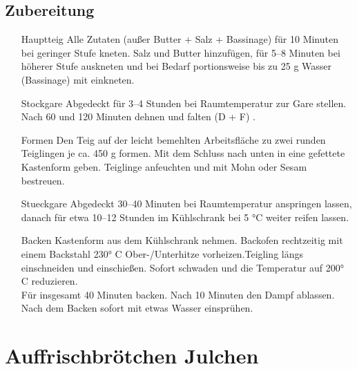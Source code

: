 \subsection*{Zubereitung}
\begin{enumerate}
    \item  [\Gls{Hauptteig}]  Alle Zutaten (außer Butter + Salz + Bassinage) für 10 Minuten bei geringer Stufe kneten. Salz und Butter hinzufügen, für 5–8 Minuten bei höherer Stufe auskneten und bei Bedarf portionsweise bis zu 25 g     Wasser (Bassinage) mit einkneten.
    \item [\Gls{Stockgare}] Abgedeckt für 3–4 Stunden bei Raumtemperatur zur Gare stellen. Nach 60 und 120 Minuten dehnen und falten (D + F) . 
    \item [\Gls{Formen}] Den Teig auf der leicht bemehlten Arbeitsfläche zu zwei runden Teiglingen je ca. 450 g formen. Mit dem Schluss nach unten in eine gefettete Kastenform geben. Teiglinge anfeuchten und mit Mohn oder Sesam bestreuen.
    \item [\Gls{Stueckgare}] Abgedeckt 30–40 Minuten bei Raumtemperatur anspringen lassen, danach für etwa 10–12 Stunden im Kühlschrank bei 5 °C weiter reifen lassen.
    \item [\Gls{Backen}] Kastenform aus dem Kühlschrank nehmen. Backofen rechtzeitig mit einem Backstahl 230° C Ober-/Unterhitze vorheizen.Teigling längs einschneiden und einschießen. Sofort schwaden und die Temperatur auf 200° C reduzieren.\\ 
    Für insgesamt 40 Minuten backen. Nach 10 Minuten den Dampf ablassen. Nach dem Backen sofort mit etwas Wasser einsprühen.   
\end{enumerate}



\section{Auffrischbrötchen Julchen}  
\cite{sonjajulchen2022}
